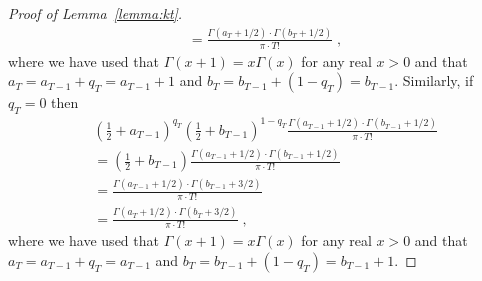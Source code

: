 \begin{proof}[Proof of Lemma~\ref{lemma:kt}]
\begin{align*}
& = \frac{\Gamma(a_{T} + 1/2) \cdot \Gamma(b_T + 1/2)}{\pi \cdot T!} \; ,
\end{align*}
where we have used that $\Gamma(x+1) = x \Gamma(x)$ for any real $x > 0$ and that $a_T = a_{T-1} + q_T = a_{T-1} + 1$ and $b_T = b_{T-1} + (1-q_T) = b_{T-1}$.
Similarly, if $q_T = 0$ then
\begin{align*}
& \left( \frac{1}{2} + a_{T-1} \right)^{q_T} \left( \frac{1}{2} + b_{T-1} \right)^{1-q_T} \frac{\Gamma(a_{T-1} + 1/2) \cdot \Gamma(b_{T-1} + 1/2)}{\pi \cdot T!} \\
& = \left( \frac{1}{2} + b_{T-1} \right) \frac{\Gamma(a_{T-1} + 1/2) \cdot \Gamma(b_{T-1} + 1/2)}{\pi \cdot T!} \\
& = \frac{\Gamma(a_{T-1} + 1/2) \cdot \Gamma(b_{T-1} + 3/2)}{\pi \cdot T!} \\
& = \frac{\Gamma(a_T + 1/2) \cdot \Gamma(b_T + 3/2)}{\pi \cdot T!} \; ,
\end{align*}
where we have used that $\Gamma(x+1) = x \Gamma(x)$ for any real $x > 0$ and that $a_T = a_{T-1} + q_T = a_{T-1}$ and $b_T = b_{T-1} + (1-q_T) = b_{T-1} + 1$.
\end{proof}

